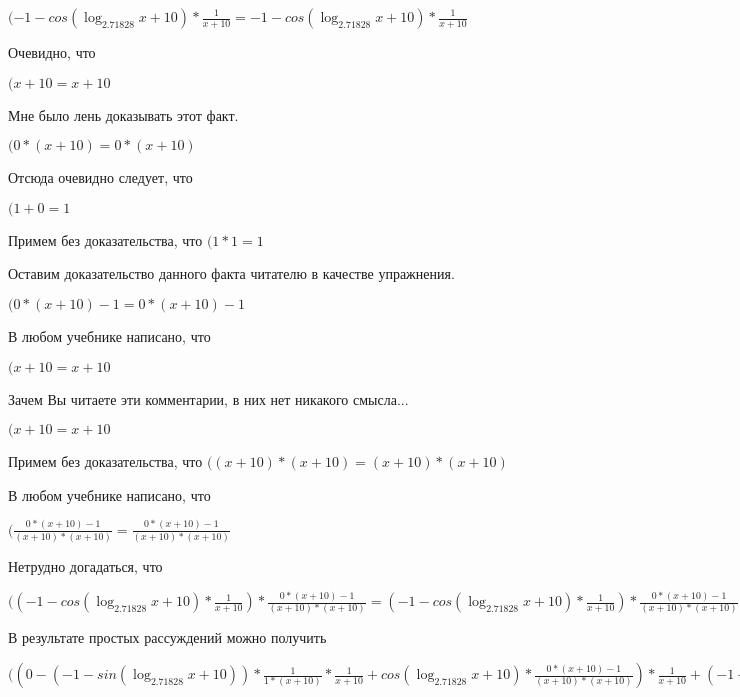\documentclass[12pt,a4paper,fleqn]{article}
\theoremstyle{definition}
\begin{document}
$( -1  - cos(\log_{ 2.71828 }{ x  +  10 }) * \frac{ 1 }{ x  +  10 }
 =  -1  - cos(\log_{ 2.71828 }{ x  +  10 }) * \frac{ 1 }{ x  +  10 }
$

Очевидно, что

$( x  +  10  =  x  +  10 $

Мне было лень доказывать этот факт.

$( 0  * ( x  +  10 ) =  0  * ( x  +  10 )$

Отсюда очевидно следует, что

$( 1  +  0  =  1 $

Примем без доказательства, что
$( 1  *  1  =  1 $

Оставим доказательство данного факта читателю в качестве упражнения.

$( 0  * ( x  +  10 ) -  1  =  0  * ( x  +  10 ) -  1 $

В любом учебнике написано, что

$( x  +  10  =  x  +  10 $

Зачем Вы читаете эти комментарии, в них нет никакого смысла...

$( x  +  10  =  x  +  10 $

Примем без доказательства, что
$(( x  +  10 ) * ( x  +  10 ) = ( x  +  10 ) * ( x  +  10 )$

В любом учебнике написано, что

$(\frac{ 0  * ( x  +  10 ) -  1 }{( x  +  10 ) * ( x  +  10 )}
 = \frac{ 0  * ( x  +  10 ) -  1 }{( x  +  10 ) * ( x  +  10 )}
$

Нетрудно догадаться, что

$(( -1  - cos(\log_{ 2.71828 }{ x  +  10 }) * \frac{ 1 }{ x  +  10 }
) * \frac{ 0  * ( x  +  10 ) -  1 }{( x  +  10 ) * ( x  +  10 )}
 = ( -1  - cos(\log_{ 2.71828 }{ x  +  10 }) * \frac{ 1 }{ x  +  10 }
) * \frac{ 0  * ( x  +  10 ) -  1 }{( x  +  10 ) * ( x  +  10 )}
$

В результате простых рассуждений можно получить

$(( 0  - ( -1  - sin(\log_{ 2.71828 }{ x  +  10 })) * \frac{ 1 }{ 1  * ( x  +  10 )}
 * \frac{ 1 }{ x  +  10 }
 + cos(\log_{ 2.71828 }{ x  +  10 }) * \frac{ 0  * ( x  +  10 ) -  1 }{( x  +  10 ) * ( x  +  10 )}
) * \frac{ 1 }{ x  +  10 }
 + ( -1  - cos(\log_{ 2.71828 }{ x  +  10 }) * \frac{ 1 }{ x  +  10 }
) * \frac{ 0  * ( x  +  10 ) -  1 }{( x  +  10 ) * ( x  +  10 )}
 = ( 0  - ( -1  - sin(\log_{ 2.71828 }{ x  +  10 })) * \frac{ 1 }{ 1  * ( x  +  10 )}
 * \frac{ 1 }{ x  +  10 }
 + cos(\log_{ 2.71828 }{ x  +  10 }) * \frac{ 0  * ( x  +  10 ) -  1 }{( x  +  10 ) * ( x  +  10 )}
) * \frac{ 1 }{ x  +  10 }
 + ( -1  - cos(\log_{ 2.71828 }{ x  +  10 }) * \frac{ 1 }{ x  +  10 }
) * \frac{ 0  * ( x  +  10 ) -  1 }{( x  +  10 ) * ( x  +  10 )}
$
\end{document}

